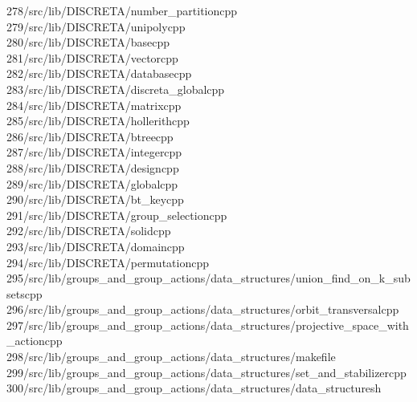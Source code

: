 \begin{tabbing}
278\>/src/lib/DISCRETA/number\_partitioncpp\\[0pt]
279\>/src/lib/DISCRETA/unipolycpp\\[0pt]
280\>/src/lib/DISCRETA/basecpp\\[0pt]
281\>/src/lib/DISCRETA/vectorcpp\\[0pt]
282\>/src/lib/DISCRETA/databasecpp\\[0pt]
283\>/src/lib/DISCRETA/discreta\_globalcpp\\[0pt]
284\>/src/lib/DISCRETA/matrixcpp\\[0pt]
285\>/src/lib/DISCRETA/hollerithcpp\\[0pt]
286\>/src/lib/DISCRETA/btreecpp\\[0pt]
287\>/src/lib/DISCRETA/integercpp\\[0pt]
288\>/src/lib/DISCRETA/designcpp\\[0pt]
289\>/src/lib/DISCRETA/globalcpp\\[0pt]
290\>/src/lib/DISCRETA/bt\_keycpp\\[0pt]
291\>/src/lib/DISCRETA/group\_selectioncpp\\[0pt]
292\>/src/lib/DISCRETA/solidcpp\\[0pt]
293\>/src/lib/DISCRETA/domaincpp\\[0pt]
294\>/src/lib/DISCRETA/permutationcpp\\[0pt]
295\>/src/lib/groups\_and\_group\_actions/data\_structures/union\_find\_on\_k\_subsetscpp\\[0pt]
296\>/src/lib/groups\_and\_group\_actions/data\_structures/orbit\_transversalcpp\\[0pt]
297\>/src/lib/groups\_and\_group\_actions/data\_structures/projective\_space\_with\_actioncpp\\[0pt]
298\>/src/lib/groups\_and\_group\_actions/data\_structures/makefile\\[0pt]
299\>/src/lib/groups\_and\_group\_actions/data\_structures/set\_and\_stabilizercpp\\[0pt]
300\>/src/lib/groups\_and\_group\_actions/data\_structures/data\_structuresh\\[0pt]

\end{tabbing}
